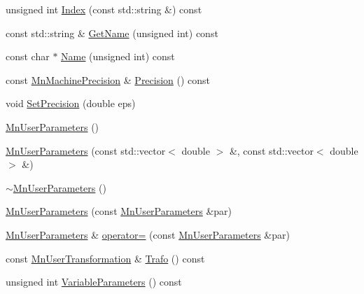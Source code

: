 \begin{DoxyCompactItemize}
\item 
unsigned int \mbox{\hyperlink{classROOT_1_1Minuit2_1_1MnUserParameters_a30523af61ec1c817b0eb060d560f9a95}{Index}} (const std\+::string \&) const
\item 
const std\+::string \& \mbox{\hyperlink{classROOT_1_1Minuit2_1_1MnUserParameters_a6061d066b67d33c98eb6d9ba36b8e269}{Get\+Name}} (unsigned int) const
\item 
const char $\ast$ \mbox{\hyperlink{classROOT_1_1Minuit2_1_1MnUserParameters_a9606a3e37135ef1f08c2fe57036d07eb}{Name}} (unsigned int) const
\item 
const \mbox{\hyperlink{classROOT_1_1Minuit2_1_1MnMachinePrecision}{Mn\+Machine\+Precision}} \& \mbox{\hyperlink{classROOT_1_1Minuit2_1_1MnUserParameters_ac10a27293b367e8b74016e625a90b661}{Precision}} () const
\item 
void \mbox{\hyperlink{classROOT_1_1Minuit2_1_1MnUserParameters_aceaa10ac8b2c83261c3cc026705ee6e0}{Set\+Precision}} (double eps)
\item 
\mbox{\hyperlink{classROOT_1_1Minuit2_1_1MnUserParameters_afc09ce197c2e03a228cc9cafc3855371}{Mn\+User\+Parameters}} ()
\item 
\mbox{\hyperlink{classROOT_1_1Minuit2_1_1MnUserParameters_a465242ec980354f799665ee8d2452d58}{Mn\+User\+Parameters}} (const std\+::vector$<$ double $>$ \&, const std\+::vector$<$ double $>$ \&)
\item 
\mbox{\hyperlink{classROOT_1_1Minuit2_1_1MnUserParameters_a3b2d1f74827108c7dc34a5eb879dcc24}{$\sim$\+Mn\+User\+Parameters}} ()
\item 
\mbox{\hyperlink{classROOT_1_1Minuit2_1_1MnUserParameters_aa4ba65a64a5dd051fecc3366c8e10617}{Mn\+User\+Parameters}} (const \mbox{\hyperlink{classROOT_1_1Minuit2_1_1MnUserParameters}{Mn\+User\+Parameters}} \&par)
\item 
\mbox{\hyperlink{classROOT_1_1Minuit2_1_1MnUserParameters}{Mn\+User\+Parameters}} \& \mbox{\hyperlink{classROOT_1_1Minuit2_1_1MnUserParameters_a21d8a1f70098c2c9c82015cf0867c8ea}{operator=}} (const \mbox{\hyperlink{classROOT_1_1Minuit2_1_1MnUserParameters}{Mn\+User\+Parameters}} \&par)
\item 
const \mbox{\hyperlink{classROOT_1_1Minuit2_1_1MnUserTransformation}{Mn\+User\+Transformation}} \& \mbox{\hyperlink{classROOT_1_1Minuit2_1_1MnUserParameters_ac5c3bff96b6fc41a790005f524e334db}{Trafo}} () const
\item 
unsigned int \mbox{\hyperlink{classROOT_1_1Minuit2_1_1MnUserParameters_af19ee84626fbdeb819e6a86e82794f19}{Variable\+Parameters}} () const

\end{DoxyCompactItemize}

